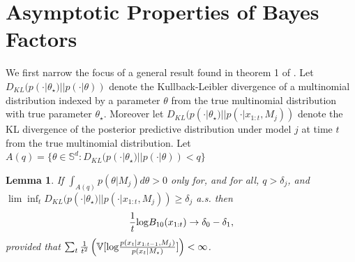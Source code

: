 \documentclass[11pt]{article}
\def\log{{\rm log}}
\newtheorem{lemma}{Lemma}[section]
\begin{document}
\section{Asymptotic Properties of Bayes Factors}
\label{app:asymptotics}
We first narrow the focus of a general result found in theorem 1 of \cite{walker}. Let $D_{KL}(p(\cdot|\theta_\star)||p(\cdot|\theta) )$ denote the Kullback-Leibler divergence of a multinomial distribution indexed by a parameter $\theta$ from the true multinomial distribution with true parameter $\theta_{\star}$. Moreover let $D_{KL}(p(\cdot|\theta_\star)||p(\cdot|x_{1:t}, M_j) )$ denote the KL divergence of the posterior predictive distribution under model $j$ at time $t$ from the true multinomial distribution. Let $A(q) = \lbrace \theta \in \mathbb{S}^d : D_{KL}(p(\cdot|\theta_\star)||p(\cdot|\theta) ) < q \rbrace$
\begin{lemma}
  \label{lemma:walker}
  If $\int_{A(q)} p(\theta|M_j) d\theta > 0$ only for, and for all, $q > \delta_j$, and $\lim \inf_t D_{KL}(p(\cdot|\theta_\star)||p(\cdot|x_{1:t}, M_j) ) \geq \delta_j$ a.s. then
  \begin{equation}
    \label{eq:bayes_factor_convergence}
    \frac{1}{t} \log B_{10}(x_{1:t}) \rightarrow \delta_0 - \delta_1,
  \end{equation}
  provided that $\sum_t \frac{1}{t^2} \left( \mathbb{V}[\log \frac{p(x_t|x_{1:t-1},M_j)}{p(x_t|M_\star )}]\right) < \infty$.
\end{lemma}
\end{document}
